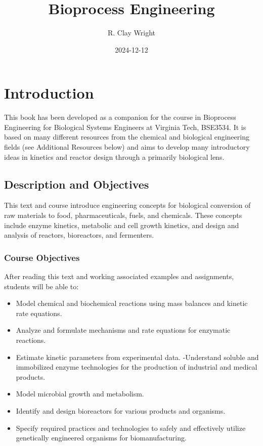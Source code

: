 \documentclass[
]{article}
\title{Bioprocess Engineering}
\author{R. Clay Wright}
\date{2024-12-12}
\providecommand{\tightlist}{%
  \setlength{\itemsep}{0pt}\setlength{\parskip}{0pt}}
\begin{document}
\maketitle

{
\setcounter{tocdepth}{3}
\tableofcontents
}
\hypertarget{introduction}{%
\section{Introduction}\label{introduction}}

This book has been developed as a companion for the course in Bioprocess Engineering for Biological Systems Engineers at Virginia Tech, BSE3534. It is based on many different resources from the chemical and biological engineering fields (see Additional Resources below) and aims to develop many introductory ideas in kinetics and reactor design through a primarily biological lens.

\hypertarget{description-and-objectives}{%
\subsection{Description and Objectives}\label{description-and-objectives}}

This text and course introduce engineering concepts for biological conversion of raw materials to food, pharmaceuticals, fuels, and chemicals. These concepts include enzyme kinetics, metabolic and cell growth kinetics, and design and analysis of reactors, bioreactors, and fermenters.

\hypertarget{course-objectives}{%
\subsubsection{Course Objectives}\label{course-objectives}}

After reading this text and working associated examples and assignments, students will be able to:

\begin{itemize}
\tightlist
\item
  Model chemical and biochemical reactions using mass balances and kinetic rate equations.
\item
  Analyze and formulate mechanisms and rate equations for enzymatic reactions.
\item
  Estimate kinetic parameters from experimental data.
  -Understand soluble and immobilized enzyme technologies for the production of industrial and medical products.
\item
  Model microbial growth and metabolism.
\item
  Identify and design bioreactors for various products and organisms.
\item
  Specify required practices and technologies to safely and effectively utilize genetically engineered organisms for biomanufacturing.
\end{itemize}
\end{document}
